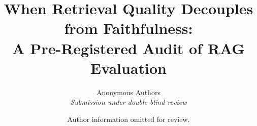 \documentclass[10pt]{article}                  %
\title{\Large\bfseries When Retrieval Quality Decouples from Faithfulness:\\[0.2em]
A Pre-Registered Audit of RAG Evaluation}
\author{Anonymous Authors\\\textit{Submission under double-blind review}}
\author{Author information omitted for review.}
\date{}
\theoremstyle{plain}
\theoremstyle{definition}
\begin{document}
\maketitle

\begin{abstract}

\end{abstract}



{\footnotesize


}

\end{document}
